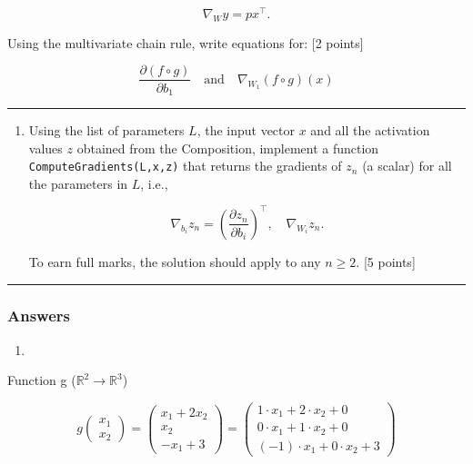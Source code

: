 \documentclass[
  letterpaper,
  DIV=11,
  numbers=noendperiod]{scrartcl}
\providecommand{\tightlist}{%
  \setlength{\itemsep}{0pt}\setlength{\parskip}{0pt}}\usepackage{longtable,booktabs,array}
\begin{document}
\[
\nabla_W y = p x^\top.
\]

Using the multivariate chain rule, write equations for: {[}2 points{]}

\[
\frac{\partial (f \circ g)}{\partial b_1} \quad \text{and} \quad \nabla_{W_1} (f \circ g)(x)
\]

\begin{center}\rule{0.5\linewidth}{0.5pt}\end{center}

\begin{enumerate}
\def\labelenumi{\arabic{enumi}.}
\setcounter{enumi}{7}
\item
  Using the list of parameters \(L\), the input vector \(x\) and all the
  activation values \(z\) obtained from the Composition, implement a
  function \texttt{ComputeGradients(L,x,z)} that returns the gradients
  of \(z_n\) (a scalar) for all the parameters in \(L\), i.e.,

  \[
  \nabla_{b_i} z_n = \left(\frac{\partial z_n}{\partial b_i}\right)^\top, \quad \nabla_{W_i} z_n.
  \]

  To earn full marks, the solution should apply to any \(n \geq 2\).
  {[}5 points{]}
\end{enumerate}

\begin{center}\rule{0.5\linewidth}{0.5pt}\end{center}

\subsubsection{Answers}\label{answers-1}

\begin{enumerate}
\def\labelenumi{\arabic{enumi}.}
\tightlist
\item
\end{enumerate}

Function g (\(\mathbb{R}^{2} \rightarrow \mathbb{R}^{3}\))

\[g\begin{pmatrix}x_1\\x_2\end{pmatrix} = \begin{pmatrix}x_1 + 2x_2\\x_2\\-x_1 + 3\end{pmatrix} = \begin{pmatrix}1 \cdot x_1 + 2 \cdot x_2 + 0\\0 \cdot x_1 + 1 \cdot x_2 + 0\\(-1) \cdot x_1 + 0 \cdot x_2 + 3\end{pmatrix}\]
\end{document}
